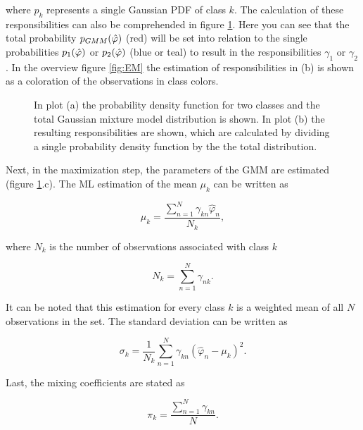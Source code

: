 where $p_k$ represents a single Gaussian \ac{PDF} of class $k$. The calculation of these responsibilities can also be comprehended in figure \ref{fig:EM_1}. Here you can see that the total probability $p_{GMM}(\hat{\varphi})$ (red) will be set into relation to the single probabilities $p_1(\hat{\varphi})$ or $p_2(\hat{\varphi})$ (blue or teal) to result in the responsibilities $\gamma_1$ or $\gamma_2$. In the overview figure \ref{fig:EM} the estimation of responsibilities in (b) is shown as a coloration of the observations in class colors.

\begin{figure}[!ht]
	\centering
    \def\svgwidth{1\linewidth}
    \scriptsize
	\caption{In plot (a) the probability density function for two classes and the total Gaussian mixture model distribution is shown. In plot (b) the resulting responsibilities are shown, which are calculated by dividing a single probability density function by the the total distribution.}
	\label{fig:EM_1}
\end{figure}

Next, in the maximization step, the parameters of the \ac{GMM} are estimated (figure \ref{fig:EM_1}.c). The \ac{ML} estimation of the mean $\mu_k$ can be written as

\begin{equation}
\mu_k = \frac{\sum^N_{n=1}\gamma_{kn}\hat{\varphi}_n}{N_k},
\label{eq:mu_em}
\end{equation}

where $N_k$ is the number of observations associated with class $k$

\begin{equation}
N_k = \sum^N_{n=1} \gamma_{nk}.
\end{equation}

It can be noted that this estimation for every class $k$ is a weighted mean of all $N$ observations in the set. The standard deviation can be written as

\begin{equation}
\sigma_k = \frac{1}{N_k}\sum^N_{n=1}\gamma_{kn}(\hat{\varphi}_n-\mu_k)^2.
\label{eq:sigma_em}
\end{equation}

Last, the mixing coefficients are stated as

\begin{equation}
\pi_k = \frac{\sum^N_{n=1}\gamma_{kn}}{N}.
\label{eq:pi_em}
\end{equation}

